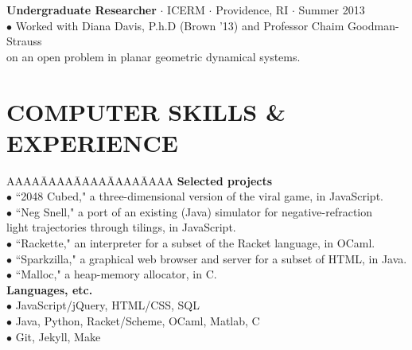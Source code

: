 \documentclass{res}
\begin{document}
\begin{resume}
\begin{tabbing}
{\bf Undergraduate Researcher} $\cdot$ ICERM $\cdot$ Providence, RI $\cdot$ Summer 2013\\
	\>$\bullet$ Worked with Diana Davis, P.h.D (Brown '13) and Professor Chaim Goodman-Strauss\\\>\phantom{$\bullet$} on an open problem in planar geometric dynamical systems.\\

   \end{tabbing}
\sectionVspace %
\section{COMPUTER SKILLS \& EXPERIENCE}
\myvspace
\begin{tabbing}
   AAAA\=AAAA\=AAAA\=AAAA\=AAAA\kill
{\bf Selected projects}\\
	\>$\bullet$ ``2048 Cubed," a three-dimensional version of the viral game, in JavaScript.\\
	\>$\bullet$ ``Neg Snell," a port of an existing (Java) simulator for negative-refraction\\\>\phantom{$\bullet$} light trajectories through tilings, in JavaScript.\\
	\>$\bullet$ ``Rackette," an interpreter for a subset of the Racket language, in OCaml.\\
	\>$\bullet$ ``Sparkzilla," a graphical web browser and server for a subset of HTML, in Java.\\
	\>$\bullet$  ``Malloc," a heap-memory allocator, in C.\\
\sbreak
{\bf Languages, etc.}\\
  \>$\bullet$ JavaScript/jQuery, HTML/CSS, SQL\\
  \>$\bullet$ Java, Python, Racket/Scheme, OCaml, Matlab, C\\
  \>$\bullet$ Git, Jekyll, Make\\
\end{tabbing}
\sectionVspace %

\end{resume}
\end{document}
